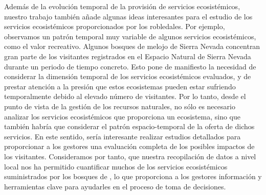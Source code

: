 Además de la evolución temporal de la provisión de servicios ecosistémicos, nuestro trabajo también añade algunas ideas interesantes para el estudio de los servicios ecosistémicos proporcionados por los robledales. Por ejemplo, observamos un patrón temporal muy variable de algunos servicios ecosistémicos, como el valor recreativo. Algunos bosques de melojo de Sierra Nevada concentran gran parte de los visitantes registrados en el Espacio Natural de Sierra Nevada durante un periodo de tiempo concreto. Esto pone de manifiesto la necesidad de considerar la dimensión temporal de los servicios ecosistémicos evaluados, y de prestar atención a la presión que estos ecosistemas pueden estar sufriendo temporalmente debido al elevado número de visitantes. Por lo tanto, desde el punto de vista de la gestión de los recursos naturales, no sólo es necesario analizar los servicios ecosistémicos que proporciona un ecosistema, sino que también habría que considerar el patrón espacio-temporal de la oferta de dichos servicios. En este sentido, sería interesante realizar estudios detallados para proporcionar a los gestores una evaluación completa de los posibles impactos de los visitantes. Consideramos por tanto, que nuestra recopilación de datos a nivel local nos ha permitido cuantificar muchos de los servicios ecosistémicos suministrados por los bosques de \Qp, lo que proporciona a los gestores información y herramientas clave para ayudarles en el proceso de toma de decisiones.